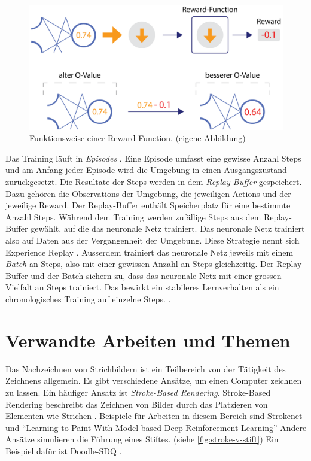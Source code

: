 \begin{figure}[!ht]
   \centering
   \includegraphics[width=\textwidth-2.2cm]{images/theorie/reinforce-2.png}
   \caption{Funktionsweise einer Reward-Function. (eigene Abbildung)}\label{fig:reinforce-2}
\end{figure}
 
Das Training läuft in \emph{Episodes} \cite[S. 14]{sutton_reinforcement_2014}.
Eine Episode umfasst eine gewisse Anzahl Steps und am Anfang jeder Episode wird
die Umgebung in einen Ausgangszustand zurückgesetzt. Die Resultate der Steps
werden in dem \emph{Replay-Buffer} gespeichert. Dazu gehören die Observations
der Umgebung, die jeweiligen Actions und der jeweilige Reward. Der
Replay-Buffer enthält Speicherplatz für eine bestimmte Anzahl Steps. Während dem
Training werden zufällige Steps aus dem Replay-Buffer gewählt, auf die das
neuronale Netz trainiert. Das neuronale Netz trainiert also auf Daten aus der
Vergangenheit der Umgebung. Diese Strategie nennt sich Experience Replay
\cite[S. 5]{mnih_playing_2013}. Ausserdem trainiert das neuronale Netz jeweils
mit einem \emph{Batch} an Steps, also mit einer gewissen Anzahl an Steps
gleichzeitig. Der Replay-Buffer und der Batch sichern zu, dass das neuronale
Netz mit einer grossen Vielfalt an Steps trainiert. Das bewirkt ein stabileres
Lernverhalten als ein chronologisches Training auf einzelne Steps.
\cite{van_heeswijk_how_2021}.

\section{Verwandte Arbeiten und Themen}\label{chap:t_ver} Das Nachzeichnen von
Strichbildern ist ein Teilbereich von der Tätigkeit des Zeichnens allgemein. Es
gibt verschiedene Ansätze, um einen Computer zeichnen zu lassen. Ein häufiger
Ansatz ist \emph{Stroke-Based Rendering}. Stroke-Based Rendering beschreibt das
Zeichnen von Bilder durch das Platzieren von Elementen wie Strichen
\cite{hertzmann_stroke-based_2002}. Beispiele für Arbeiten in diesem Bereich sind
Strokenet \cite{zheng_strokenet_2018} und ``Learning to Paint With Model-based
Deep Reinforcement Learning'' \cite{huang_learning_2019} Andere Ansätze
simulieren die Führung eines Stiftes. (siehe \autoref{fig:stroke-v-stift}) Ein
Beispiel dafür ist Doodle-SDQ \cite{zhou_learning_2018}.
 

